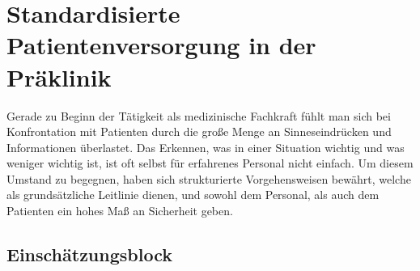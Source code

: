 \documentclass[
ngerman,
paper=a4,
asymmetric,
fontsize=10pt,
headings=small,
draft=false,
numbers=noenddot,
bibtotocnumbered,
footnotes=multiple,
]{scrreprt}
\begin{document}

\section{Standardisierte Patientenversorgung in der
Präklinik} Gerade zu Beginn der Tätigkeit als medizinische
Fachkraft fühlt man sich bei Konfrontation mit Patienten durch die
große Menge an Sinneseindrücken und Informationen überlastet. 
Das Erkennen, was in einer Situation wichtig und was weniger
wichtig ist, ist oft selbst für erfahrenes Personal nicht einfach.
Um diesem Umstand zu begegnen, haben sich strukturierte
Vorgehensweisen bewährt, welche als grundsätzliche Leitlinie
dienen, und sowohl dem Personal, als auch dem Patienten ein
hohes Maß an Sicherheit geben.







\subsection{Einschätzungsblock}
\label{topic:ersteinschaetzung}
\label{topic:einschaetzungsblock}
\end{document}

